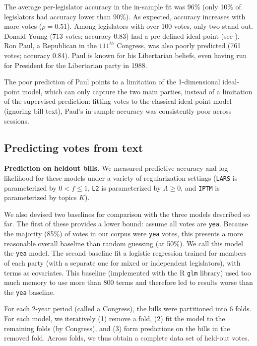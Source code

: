 The average per-legislator accuracy in the in-sample fit was 96\%
(only 10\% of legislators had accuracy lower than 90\%).  As expected,
accuracy increases with more votes ($\rho=0.51$).  Among legislators
with over 100 votes, only two stand out. Donald Young (713 votes;
accuracy 0.83) had a pre-defined ideal point (see ). Ron
Paul, a Republican in the $111^{th}$ Congress, was also poorly
predicted (761 votes; accuracy 0.84).  Paul is known for his
Libertarian beliefs, even having run for President for the Libertarian
party in 1988.

The poor prediction of Paul points to a limitation of the
1-dimensional ideal-point model, which can only capture the two main
parties, instead of a limitation of the supervised prediction: fitting
votes to the classical ideal point model (ignoring bill text), Paul's
in-sample accuracy was consistently poor across sessions.

\subsection{Predicting votes from text}

\textbf{Prediction on heldout bills.}  We measured predictive accuracy
and log likelihood for these models under a variety of regularization
settings (\verb!LARS! is parameterized by $0 < f \le 1$, \verb!L2! is
parameterized by $\Lambda \ge 0$, and \verb!IPTM! is parameterized by
topics $K$).

We also devised two baselines for comparison with the three models
described so far.  The first of these provides a lower bound: assume
all votes are \verb!yea!.  Because the majority (85\%) of votes in our
corpus were \verb!yea! votes, this presents a more reasonable overall
baseline than random guessing (at 50\%).  We call this model the
\verb!yea!  model.  The second baseline fit a logistic regression
trained for members of each party (with a separate one for mixed or
independent legislators), with terms as covariates.  This baseline
(implemented with the R \verb!glm! library) used too much memory to
use more than 800 terms and therefore led to results worse than the
\verb!yea!  baseline.

For each 2-year period (called a Congress), the bills were partitioned
into 6 folds.  For each model, we iteratively (1) remove a fold, (2)
fit the model to the remaining folds (by Congress), and (3) form
predictions on the bills in the removed fold.  Across folds, we thus
obtain a complete data set of held-out votes.

